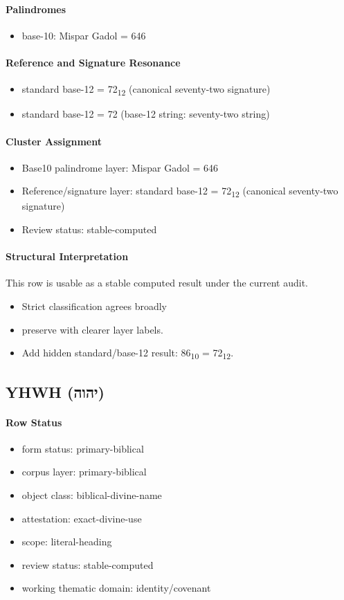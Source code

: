 \paragraph{Palindromes}
\begin{itemize}
\item base-10: Mispar Gadol = 646
\end{itemize}
\paragraph{Reference and Signature Resonance}
\begin{itemize}
\item standard base-12 = 72\textsubscript{12} (canonical seventy-two signature)
\item standard base-12 = 72 (base-12 string: seventy-two string)
\end{itemize}
\paragraph{Cluster Assignment}
\begin{itemize}
\item Base10 palindrome layer: Mispar Gadol = 646
\item Reference/signature layer: standard base-12 = 72\textsubscript{12} (canonical seventy-two signature)
\item Review status: stable-computed
\end{itemize}
\paragraph{Structural Interpretation}
This row is usable as a stable computed result under the current audit.

\begin{itemize}
\item Strict classification agrees broadly
\item preserve with clearer layer labels.
\item Add hidden standard/base-12 result: 86\textsubscript{10} = 72\textsubscript{12}.
\end{itemize}

\subsection{YHWH (יהוה)}
\paragraph{Row Status}
\begin{itemize}
\item form status: primary-biblical
\item corpus layer: primary-biblical
\item object class: biblical-divine-name
\item attestation: exact-divine-use
\item scope: literal-heading
\item review status: stable-computed
\item working thematic domain: identity/covenant
\end{itemize}
